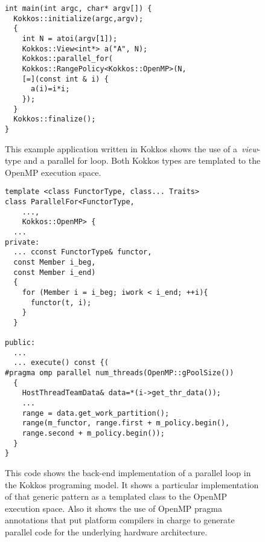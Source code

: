 \begin{figure}
\begin{small}
\begin{Verbatim}[frame=leftline]
int main(int argc, char* argv[]) {
  Kokkos::initialize(argc,argv);
  {
    int N = atoi(argv[1]);
    Kokkos::View<int*> a("A", N);  
    Kokkos::parallel_for(
    Kokkos::RangePolicy<Kokkos::OpenMP>(N,
    [=](const int & i) {
      a(i)=i*i;
    }); 
  }
  Kokkos::finalize();
}
\end{Verbatim}
\end{small}
\caption{This example application written in Kokkos shows the use of a~\emph{view}-type and a parallel for loop. Both Kokkos types are templated to the OpenMP execution space.}
\label{fig:KokkosExample}
\end{figure}

\begin{figure}
\begin{small}
\begin{Verbatim}[frame=leftline]
template <class FunctorType, class... Traits>
class ParallelFor<FunctorType, 
    ..., 
    Kokkos::OpenMP> {
  ...
private:
  ... cconst FunctorType& functor, 
  const Member i_beg,
  const Member i_end) 
  {
    for (Member i = i_beg; iwork < i_end; ++i){
      functor(t, i);
    }
  }

public:
  ...
  ... execute() const {(
#pragma omp parallel num_threads(OpenMP::gPoolSize())
  {
    HostThreadTeamData& data=*(i->get_thr_data());
    ...
    range = data.get_work_partition();
    range(m_functor, range.first + m_policy.begin(),
    range.second + m_policy.begin());
  }
}

\end{Verbatim}
\end{small}
\caption{This code shows the back-end implementation of a parallel loop in the Kokkos programing model. It shows a particular implementation of that generic pattern as a templated class to the OpenMP execution space. Also it shows the use of OpenMP pragma annotations that put platform compilers in charge to generate parallel code for the underlying hardware architecture.}
\label{fig:KokkosExampleOMPBackEnd}
\end{figure}


